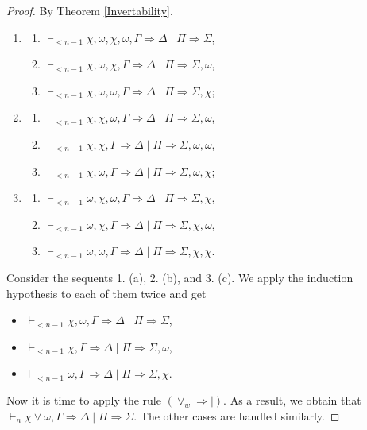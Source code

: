 \documentclass[10pt,a4paper]{article}
\theoremstyle{definition}
\newcommand{\3}{\vspace{.3in}}
\newcommand{\2}{\vspace{.2in}}
\newcommand{\1}{\vspace{.1in}}
\newcommand{\5}{\vspace{.05in}}
\begin{document}
\begin{proof}
By Theorem \ref{Invertability}, \begin{enumerate}\itemsep=0pt
\item	\begin{enumerate}\itemsep=0pt
\item	$\vdash_{<n-1}  \chi,\omega,\chi,\omega,\Gamma\Rightarrow\Delta\mid \Pi\Rightarrow\Sigma $,
\item $\vdash_{<n-1}  \chi,\omega,\chi,\Gamma\Rightarrow\Delta\mid \Pi\Rightarrow\Sigma,\omega $, 
\item $\vdash_{<n-1}  \chi,\omega,\omega,\Gamma\Rightarrow\Delta\mid \Pi\Rightarrow\Sigma,\chi $;
\end{enumerate}
\item \begin{enumerate}\itemsep=0pt
\item $\vdash_{<n-1} \chi,\chi,\omega,\Gamma\Rightarrow\Delta\mid \Pi\Rightarrow\Sigma,\omega $,
\item $\vdash_{<n-1} \chi,\chi,\Gamma\Rightarrow\Delta\mid \Pi\Rightarrow\Sigma,\omega,\omega $,
\item $\vdash_{<n-1} \chi,\omega,\Gamma\Rightarrow\Delta\mid \Pi\Rightarrow\Sigma,\omega,\chi $;
\end{enumerate}
\item \begin{enumerate}\itemsep=0pt
	\item $\vdash_{<n-1} \omega,\chi,\omega,\Gamma\Rightarrow\Delta\mid \Pi\Rightarrow\Sigma,\chi $,
	\item $\vdash_{<n-1} \omega,\chi,\Gamma\Rightarrow\Delta\mid \Pi\Rightarrow\Sigma,\chi,\omega $,
	\item $\vdash_{<n-1} \omega,\omega,\Gamma\Rightarrow\Delta\mid \Pi\Rightarrow\Sigma,\chi,\chi $.	
\end{enumerate}
\end{enumerate}

Consider the sequents 1. (a), 2. (b), and 3. (c). We apply the induction hypothesis to each of them twice and get 
\begin{itemize}\itemsep=0pt
\item $\vdash_{<n-1}  \chi,\omega,\Gamma\Rightarrow\Delta\mid \Pi\Rightarrow\Sigma $,
\item $\vdash_{<n-1} \chi,\Gamma\Rightarrow\Delta\mid \Pi\Rightarrow\Sigma,\omega $,
	\item $\vdash_{<n-1} \omega,\Gamma\Rightarrow\Delta\mid \Pi\Rightarrow\Sigma,\chi$.
\end{itemize}

Now it is time to apply the rule $ (\vee_w\Rightarrow\mid) $. As a result, we obtain that $\vdash_{n}  \chi\vee\omega,\Gamma\Rightarrow\Delta\mid \Pi\Rightarrow\Sigma $. The other cases are handled similarly.
\end{proof}
\end{document}
